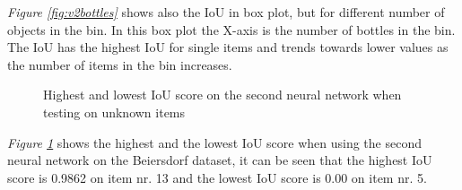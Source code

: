 \textit{Figure \ref{fig:v2bottles}} shows also the IoU in box plot, but for different number of objects in the bin. In this box plot the X-axis is the number of bottles in the bin. The IoU has the highest IoU for single items and trends towards lower values as the number of items in the bin increases.

\begin{figure}[h]
    \centering
    \hfill
    
    \caption{Highest and lowest IoU score on the second neural network when testing on unknown items}
    \label{fig:v2unknowniou2}
\end{figure}

\textit{Figure \ref{fig:v2unknowniou2}} shows the highest and the lowest IoU score when using the second neural network on the Beiersdorf dataset, it can be seen that the highest IoU score is 0.9862 on item nr. 13 and the lowest IoU score is 0.00 on item nr. 5.

